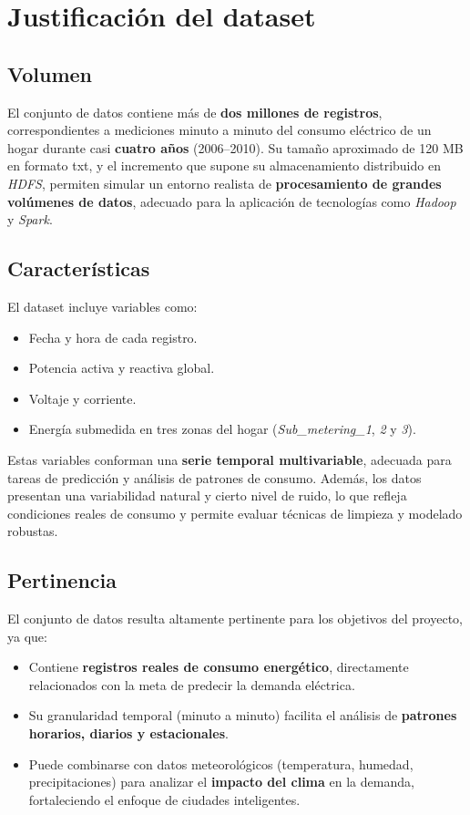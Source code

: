 \documentclass[12pt,a4paper]{article}
\begin{document}
\section{Justificación del dataset}

\subsection*{Volumen}
El conjunto de datos contiene más de \textbf{dos millones de registros}, correspondientes a mediciones minuto a minuto del consumo eléctrico de un hogar durante casi \textbf{cuatro años} (2006–2010).  
Su tamaño aproximado de 120 MB en formato txt, y el incremento que supone su almacenamiento distribuido en \textit{HDFS}, permiten simular un entorno realista de \textbf{procesamiento de grandes volúmenes de datos}, adecuado para la aplicación de tecnologías como \textit{Hadoop} y \textit{Spark}.

\subsection*{Características}
El dataset incluye variables como:
\begin{itemize}
    \item Fecha y hora de cada registro.
    \item Potencia activa y reactiva global.
    \item Voltaje y corriente.
    \item Energía submedida en tres zonas del hogar (\textit{Sub\_metering\_1}, \textit{2} y \textit{3}).
\end{itemize}
Estas variables conforman una \textbf{serie temporal multivariable}, adecuada para tareas de predicción y análisis de patrones de consumo.  
Además, los datos presentan una variabilidad natural y cierto nivel de ruido, lo que refleja condiciones reales de consumo y permite evaluar técnicas de limpieza y modelado robustas.

\subsection*{Pertinencia}
El conjunto de datos resulta altamente pertinente para los objetivos del proyecto, ya que:
\begin{itemize}
    \item Contiene \textbf{registros reales de consumo energético}, directamente relacionados con la meta de predecir la demanda eléctrica.
    \item Su granularidad temporal (minuto a minuto) facilita el análisis de \textbf{patrones horarios, diarios y estacionales}.
    \item Puede combinarse con datos meteorológicos (temperatura, humedad, precipitaciones) para analizar el \textbf{impacto del clima} en la demanda, fortaleciendo el enfoque de ciudades inteligentes.
\end{itemize}
\end{document}
